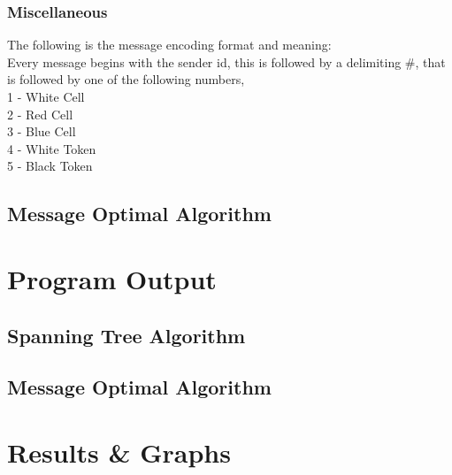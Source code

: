 \documentclass[a4paper,12pt]{report}
\begin{document}
\subsubsection{Miscellaneous}
The following is the message encoding format and meaning:\\
Every message begins with the sender id, this is followed by a delimiting \#, that is followed by one of the following numbers,\\
 1 - White Cell\\
 2 - Red Cell\\
 3 - Blue Cell\\
 4 - White Token\\
 5 - Black Token\\
\subsection{Message Optimal Algorithm}
\newpage
\section{Program Output}
\subsection{Spanning Tree Algorithm}
\subsection{Message Optimal Algorithm}
\newpage
\section{Results \& Graphs}
\end{document}
